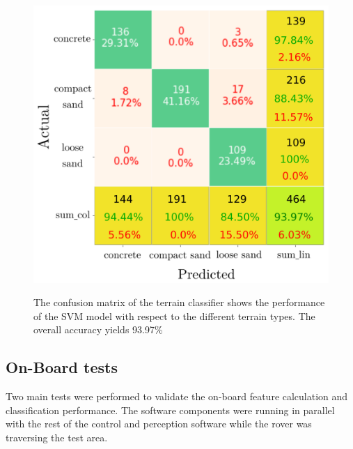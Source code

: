 \begin{figure}
    \centering
    {\includegraphics[width=\columnwidth]{../figures/confusionmatrix_Train_yellow.png}}
    \caption{ The confusion matrix of the terrain classifier shows the performance of the SVM model with respect to the different terrain types. The overall accuracy yields 93.97\% }
    \label{fig:CM}
\end{figure}




\subsection{On-Board tests}

Two main tests were performed to validate the on-board feature calculation and classification performance. The software components were running in parallel with the rest of the control and perception software while the rover was traversing
the test area.

